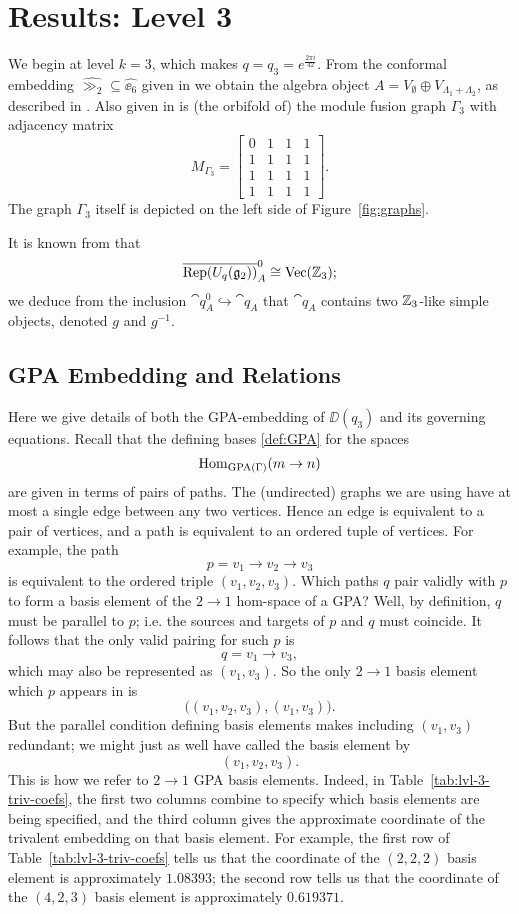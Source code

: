 \section{Results: Level 3}\label{sec:results-3}

We begin at level $k=3$, which makes $q=q_3=e^{\frac{2\pi i}{42}}$. 
From the conformal embedding $\hat{\gg_2}\subseteq\hat{\ee_6}$ given in \cite{DMNO} we obtain the 
algebra object $A=V_{\emptyset} \oplus V_{\Lambda_1+\Lambda_2}$, as described in \cite{g2_graphs}. 
Also given in \cite{g2_graphs} is (the orbifold of) the module fusion graph $\Gamma_3$ with adjacency matrix
\[
    M_{\Gamma_3} = \begin{bmatrix} 0&1&1&1\\ 1&1&1&1\\ 1&1&1&1\\ 1&1&1&1\end{bmatrix}.
\]
The graph $\Gamma_3$ itself is depicted on the left side of Figure~\ref{fig:graphs}.

It is known from \cite{DMNO} that 
\[
    \overline{\operatorname{Rep}(U_{q}(\mathfrak{g}_2))}_A^0\cong \operatorname{Vec}(\mathbb{Z}_3);
\]
we deduce from the inclusion $\cat{q}_A^0 \hookrightarrow \cat{q}_A$ that $\cat{q}_A$ contains two $\mathbb{Z}_3$-like simple objects, denoted $g$ and $g^{-1}$. 



\subsection{GPA Embedding and Relations}
Here we give details of both the GPA-embedding of $\DD(q_3)$ and its governing equations. 
Recall that the defining bases \ref{def:GPA} for the spaces 
\[
    \operatorname{Hom}_{\operatorname{GPA}(\Gamma)}(m\to n)
\]
are given in terms of pairs of paths. 
The (undirected) graphs we are using have at most a single edge between any two vertices. 
Hence an edge is equivalent to a pair of vertices, and a path is equivalent to an ordered tuple of vertices. 
For example, the path
\[
    p = v_1 \longrightarrow v_2 \longrightarrow v_3
\]
is equivalent to the ordered triple $(v_1,v_2,v_3)$. 
Which paths $q$ pair validly with $p$ to form a basis element of the $2\to 1$ hom-space of a GPA? 
Well, by definition, $q$ must be parallel to $p$; i.e. the sources and targets of $p$ and $q$ must coincide. 
It follows that the only valid pairing for such $p$ is
\[
    q = v_1 \longrightarrow v_3,
\]
which may also be represented as $(v_1,v_3)$. 
So the only $2\to 1$ basis element which $p$ appears in is
\[
    \big( (v_1,v_2,v_3), (v_1,v_3) \big).
\]
But the parallel condition defining basis elements makes including $(v_1,v_3)$ redundant; we might just as well have called the basis element by 
\[
    (v_1,v_2,v_3).
\]
This is how we refer to $2\to 1$ GPA basis elements. 
Indeed, in Table~\ref{tab:lvl-3-triv-coefs}, the first two columns combine to specify which basis elements are being specified, and the third column gives the approximate coordinate of the trivalent embedding on that basis element. 
For example, the first row of Table~\ref{tab:lvl-3-triv-coefs} tells us that the coordinate of the $(2,2,2)$ basis element is approximately $1.08393$; the second row tells us that the coordinate of the $(4,2,3)$ basis element is approximately $0.619371$. 

